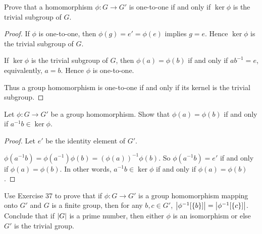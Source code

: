 \begin{exercise}
    Prove that a homomorphism $\phi: G\to G'$ is one-to-one if and only if $\ker\phi$ is the trivial subgroup of $G$.
\end{exercise}

\begin{proof}
    If $\phi$ is one-to-one, then $\phi(g) = e' = \phi(e)$ implies $g = e$. Hence $\ker\phi$ is the trivial subgroup of $G$.

    If $\ker\phi$ is the trivial subgroup of $G$, then $\phi(a) = \phi(b)$ if and only if $ab^{-1} = e$, equivalently, $a = b$. Hence $\phi$ is one-to-one.

    Thus a group homomorphism is one-to-one if and only if its kernel is the trivial subgroup.
\end{proof}

\begin{exercise}
    Let $\phi: G\to G'$ be a group homomorphism. Show that $\phi(a) = \phi(b)$ if and only if $a^{-1}b\in \ker\phi$.
\end{exercise}

\begin{proof}
    Let $e'$ be the identity element of $G'$.

    $\phi(a^{-1}b) = \phi(a^{-1})\phi(b) = {(\phi(a))}^{-1}\phi(b)$. So $\phi(a^{-1}b) = e'$ if and only if $\phi(a) = \phi(b)$. In other words, $a^{-1}b\in\ker\phi$ if and only if $\phi(a) = \phi(b)$.
\end{proof}

\begin{exercise}
    Use Exercise 37 to prove that if $\phi: G\to G'$ is a group homomorphism mapping onto $G'$ and $G$ is a finite group, then for any $b, c\in G'$, $\left\vert{\phi^{-1}[\{b\}]}\right\vert = \left\vert{\phi^{-1}[\{c\}]}\right\vert$. Conclude that if $\left\vert{G}\right\vert$ is a prime number, then either $\phi$ is an isomorphism or else $G'$ is the trivial group.
\end{exercise}

